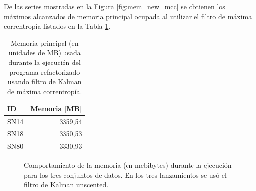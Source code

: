 De las series mostradas en la Figura \ref{fig:mem_new_mcc} se obtienen los m\'aximos alcanzados de memoria principal ocupada al utilizar el filtro de m\'axima correntrop\'ia listados en la Tabla \ref{tab:mem4}. 
\bigskip

\begin{table}[h!]
\centering
\caption{Memoria principal (en unidades de MB) usada durante la ejecuci\'on del programa refactorizado usando filtro de Kalman de m\'axima correntrop\'ia.}
\begin{tabular}{|l|r|}
\hline
\textbf{ID} & Memoria [MB]\\\hline\hline
SN14 & 3359,54\\\hline
SN18 & 3350,53\\\hline
SN80 & 3330,93\\\hline
\end{tabular}
\label{tab:mem4}
\end{table}

\begin{figure}[h!]
\centering
{}\hfill
{}\vfill
{}
\caption{Comportamiento de la memoria (en mebibytes) durante la ejecuci\'on para los tres conjuntos de datos. En los tres lanzamientos se us\'o el filtro de Kalman unscented.}
\label{fig:mem_ukf}
\end{figure}

